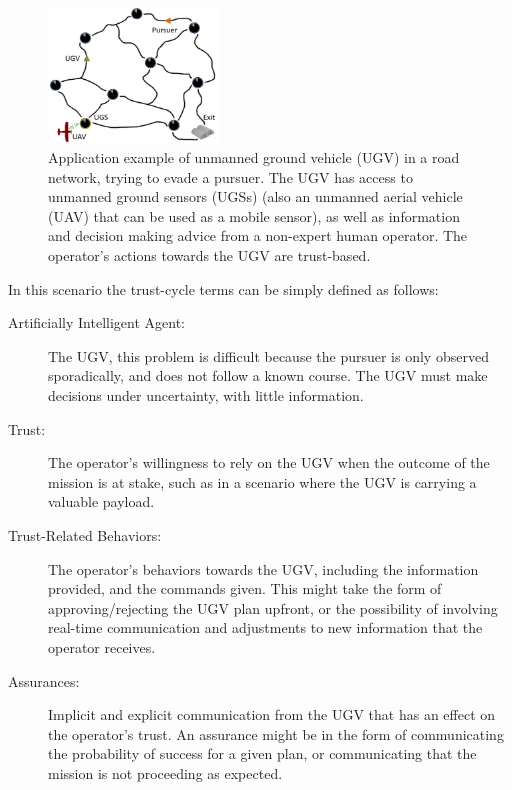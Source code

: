 	\begin{figure}[htbp]
    	\centering
     	\includegraphics[width=0.4\textwidth]{Figures/RoadNet}
    	\caption{Application example of unmanned ground vehicle (UGV) in a road network, trying to evade a pursuer. The UGV has access to unmanned ground sensors (UGSs) (also an unmanned aerial vehicle (UAV) that can be used as a mobile sensor), as well as information and decision making advice from a non-expert human operator. The operator's actions towards the UGV are trust-based.}
        \label{fig:RoadNet}
    \end{figure}

    In this scenario the trust-cycle terms can be simply defined as follows:

    \begin{description}
        \item [Artificially Intelligent Agent:] The UGV, this problem is difficult because the pursuer is only observed sporadically, and does not follow a known course. The UGV must make decisions under uncertainty, with little information. 
        \item [Trust:] The operator's willingness to rely on the UGV when the outcome of the mission is at stake, such as in a scenario where the UGV is carrying a valuable payload.
        \item [Trust-Related Behaviors:] The operator's behaviors towards the UGV, including the information provided, and the commands given. This might take the form of approving/rejecting the UGV plan upfront, or the possibility of involving real-time communication and adjustments to new information that the operator receives.
        \item [Assurances:] Implicit and explicit communication from the UGV that has an effect on the operator's trust. An assurance might be in the form of communicating the probability of success for a given plan, or communicating that the mission is not proceeding as expected.
    \end{description}

